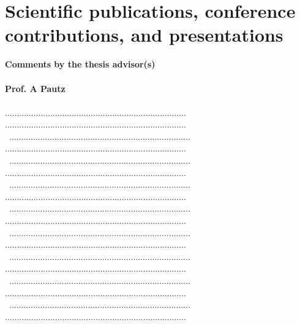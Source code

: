 \documentclass[11pt,titlepage]{article}
\begin{document}
\section{Scientific publications, conference contributions, and presentations}

\nocite{Wicaksono2014a}
\nocite{Wicaksono2014b}
\nocite{Wicaksono2014c}
\nocite{Wicaksono2015a}
\nocite{Wicaksono2015b}
\nocite{Wicaksono2015c}

\printbibliography[heading=none]

\newpage
\noindent\textbf{Comments by the thesis advisor(s)}\\\\
\noindent\textbf{Prof. A Pautz}\\\\
............................................................................
............................................................................\\\
............................................................................
............................................................................\\\
............................................................................
............................................................................\\\
............................................................................
............................................................................\\\
............................................................................
............................................................................\\\
............................................................................
............................................................................\\\
............................................................................
............................................................................\\\
............................................................................
............................................................................\\\
............................................................................
............................................................................\\\
\end{document}
